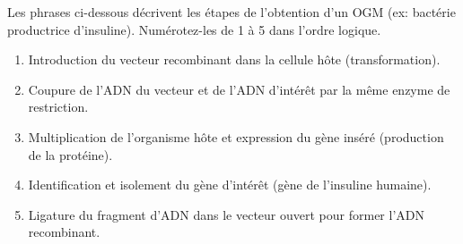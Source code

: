 \documentclass[11pt]{article}
\begin{document}
\begin{exercice}
Les phrases ci-dessous décrivent les étapes de l'obtention d'un OGM (ex: bactérie productrice d'insuline). Numérotez-les de 1 à 5 dans l'ordre logique.
\begin{enumerate}
    \item Introduction du vecteur recombinant dans la cellule hôte (transformation).
    \item Coupure de l'ADN du vecteur et de l'ADN d'intérêt par la même enzyme de restriction.
    \item Multiplication de l'organisme hôte et expression du gène inséré (production de la protéine).
    \item Identification et isolement du gène d'intérêt (gène de l'insuline humaine).
    \item Ligature du fragment d'ADN dans le vecteur ouvert pour former l'ADN recombinant.
\end{enumerate}
\end{exercice}
\end{document}
